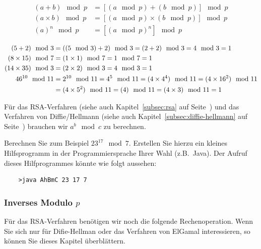\begin{align}
    \label{eq:mod}
    (a + b) \mod p &= [(a \mod p) + (b \mod p)] \mod p             \\
    (a \times b) \mod p &= [(a \mod p) \times (b \mod p)] \mod p   \\
    (a)^n \mod p &= [(a \mod p)^n] \mod p
\end{align}

\begin{beispiel}
    \label{ex:modulo}
\end{beispiel}


\begin{align*}
    (5 + 2)\mod 3 &= ((5\mod 3) + 2) \mod 3 = (2 + 2) \mod 3 = 4 \mod 3 = 1 \\
    (8 \times 15) \mod 7 &= (1 \times 1) \mod 7 = 1 \mod 7 = 1              \\
    (14 \times 35) \mod 3 &= (2 \times 2) \mod 3 = 4 \mod 3 = 1             \\
    46^{10} \mod 11 &= 2^{10} \mod 11 = 4^5 \mod 11 = (4\times 4^4) \mod 11 = (4\times 16^2) \mod 11 \\
    &= (4\times 5^2) \mod 11 = (4\time 25) \mod 11 = (4\times 3) \mod 11 = 1
\end{align*}

\begin{bemerkung}[RSA]
    Für das RSA-Verfahren (siehe auch Kapitel~\ref{subsec:rsa} auf Seite~\pageref{subsec:rsa})
    und das Verfahren von Diffie/Hellmann (siehe auch Kapitel~\ref{subsec:diffie-hellmann}
    auf Seite~\pageref{subsec:diffie-hellmann}) brauchen wir $a^b \mod c$ zu berechnen.
\end{bemerkung}

\begin{Exercise}[%
title={Modulo Berechnung},
label={exercise:modulo}]
\end{Exercise}
Berechnen Sie zum Beispiel $23^{17} \mod 7$. Erstellen Sie hierzu ein kleines
Hilfsprogramm in der Programmiersprache Ihrer Wahl (z.B.~Java). Der Aufruf dieses
Hilfprogrammes könnte wie folgt aussehen:
\begin{verbatim}
    >java AhBmC 23 17 7
\end{verbatim}


\subsubsection*{Inverses Modulo $p$}

Für das RSA-Verfahren benötigen wir noch die folgende Rechenoperation.
Wenn Sie sich nur für Difie-Hellman oder das Verfahren von ElGamal
interessieren, so können Sie dieses Kapitel überblättern.

